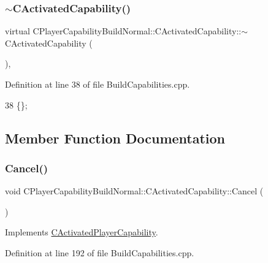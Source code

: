 \subsubsection{\texorpdfstring{$\sim$\+C\+Activated\+Capability()}{~CActivatedCapability()}}
{\footnotesize\ttfamily virtual C\+Player\+Capability\+Build\+Normal\+::\+C\+Activated\+Capability\+::$\sim$\+C\+Activated\+Capability (\begin{DoxyParamCaption}{ }\end{DoxyParamCaption})\hspace{0.3cm}{\ttfamily [inline]}, {\ttfamily [virtual]}}



Definition at line 38 of file Build\+Capabilities.\+cpp.


\begin{DoxyCode}
38 \{\};
\end{DoxyCode}


\subsection{Member Function Documentation}
\hypertarget{classCPlayerCapabilityBuildNormal_1_1CActivatedCapability_a7cc74f98f4071edfa75395d02d897fef}{}\label{classCPlayerCapabilityBuildNormal_1_1CActivatedCapability_a7cc74f98f4071edfa75395d02d897fef} 
\subsubsection{\texorpdfstring{Cancel()}{Cancel()}}
{\footnotesize\ttfamily void C\+Player\+Capability\+Build\+Normal\+::\+C\+Activated\+Capability\+::\+Cancel (\begin{DoxyParamCaption}{ }\end{DoxyParamCaption})\hspace{0.3cm}{\ttfamily [virtual]}}



Implements \hyperlink{classCActivatedPlayerCapability_a5cde83be468e262ad054d81e28684a81}{C\+Activated\+Player\+Capability}.



Definition at line 192 of file Build\+Capabilities.\+cpp.


